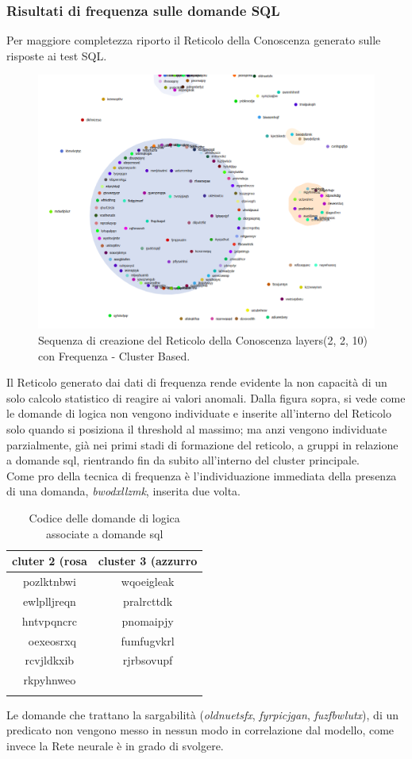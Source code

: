 \subsubsection{Risultati di frequenza sulle domande SQL}
\label{Risultati di frequenza sulle domande SQL}
Per maggiore completezza riporto il Reticolo della Conoscenza generato sulle risposte ai test SQL.
\begin{figure}[H]
\centering
	\includegraphics[width=0.70\linewidth]{./image/frequence-sql(2,2,10).png}
	\caption{Sequenza di creazione del Reticolo della Conoscenza layers(2, 2, 10) con Frequenza - Cluster Based.}
	\label{Sequenza di creazione del Reticolo della Conoscenza layers(2, 2, 10) con Frequenza - Cluster Based.}
\end{figure}
\noindent
Il Reticolo generato dai dati di frequenza rende evidente la non capacità di un solo calcolo statistico di reagire ai valori anomali. Dalla figura sopra, si vede come  le domande di logica non vengono individuate e inserite all'interno del Reticolo solo quando si posiziona il threshold al massimo; ma anzi vengono individuate parzialmente, già nei primi stadi di formazione del reticolo, a gruppi in relazione a domande sql, rientrando fin da subito all'interno del cluster principale.\\
\noindent
Come pro della tecnica di frequenza è l'individuazione immediata della presenza di una domanda,  \textit{bwodxllzmk}, inserita due volta.

\begin{longtable}{|c|c|}
	\hline
	\textbf{cluter 2 (rosa} & \textbf{cluster 3 (azzurro} \\\hline\hline
	pozlktnbwi & wqoeigleak \\
	ewlplljreqn & pralrcttdk \\
	hntvpqncrc & pnomaipjy \\\
	oexeosrxq & fumfugvkrl \\
	rcvjldkxib & rjrbsovupf \\
    rkpyhnweo \\
\hline	
\caption{Codice delle domande di logica associate a domande sql}\label{tab:Codice delle domande di logica associate a domande sql}
\end{longtable}
\noindent
Le domande che trattano la sargabilità  (\textit{oldnuetsfx}, \textit{fyrpicjgan}, \textit{fuzfbwlutx}), di un predicato non vengono messo in nessun modo in correlazione dal modello, come invece la Rete neurale è in grado di svolgere.
	
	









